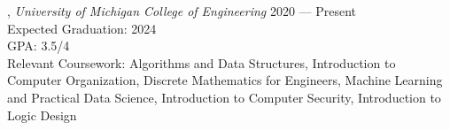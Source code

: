 
, \textit{University of Michigan College of Engineering}	\hfill 2020 --- Present \\
\text Expected Graduation: 2024 \\
 \text GPA: 3.5/4 \\
 \text Relevant Coursework: Algorithms and Data Structures, Introduction to Computer Organization, Discrete Mathematics for Engineers, Machine Learning and Practical Data Science, Introduction to Computer Security, Introduction to Logic Design

